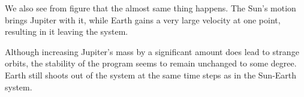 We also see from figure  that the almost same thing happens.
The Sun's motion brings Jupiter with it, while Earth gains a very large velocity
at one point, resulting in it leaving the system.

Although increasing Jupiter's mass by a significant amount does lead to strange
orbits, the stability of the program seems to remain unchanged to some degree.
Earth still shoots out of the system at the same time steps as in the Sun-Earth
system.

